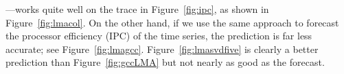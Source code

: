 ---works quite well on the trace in Figure~\ref{fig:ipc}, as
shown in Figure~\ref{fig:lmacol}. 
%
%  
%
%
%
On the other hand, if we use the same approach to forecast the
processor efficiency (IPC) of the \gcc time series, the
prediction is far less accurate; see Figure~\ref{fig:lmagcc}.
Figure~\ref{fig:lmasvdfive} is clearly a better prediction than Figure~\ref{fig:gccLMA} but not nearly as good as the \col forecast.


